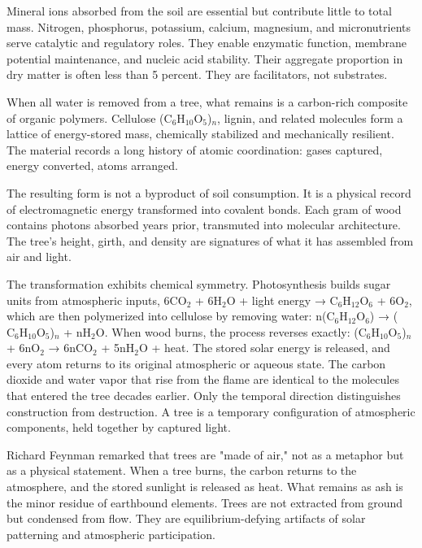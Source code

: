 Mineral ions absorbed from the soil are essential but contribute little to total mass. Nitrogen, phosphorus, potassium, calcium, magnesium, and micronutrients serve catalytic and regulatory roles. They enable enzymatic function, membrane potential maintenance, and nucleic acid stability. Their aggregate proportion in dry matter is often less than 5 percent. They are facilitators, not substrates.

When all water is removed from a tree, what remains is a carbon-rich composite of organic polymers. Cellulose (C\(_6\)H\(_{10}\)O\(_5\))\(_n\), lignin, and related molecules form a lattice of energy-stored mass, chemically stabilized and mechanically resilient. The material records a long history of atomic coordination: gases captured, energy converted, atoms arranged.

The resulting form is not a byproduct of soil consumption. It is a physical record of electromagnetic energy transformed into covalent bonds. Each gram of wood contains photons absorbed years prior, transmuted into molecular architecture. The tree's height, girth, and density are signatures of what it has assembled from air and light.

The transformation exhibits chemical symmetry. Photosynthesis builds sugar units from atmospheric inputs, 6\(\mathrm{CO}_2\) + 6\(\mathrm{H}_2\mathrm{O}\) + light energy → \(\mathrm{C}_6\mathrm{H}_{12}\mathrm{O}_6\) + 6\(\mathrm{O}_2\), which are then polymerized into cellulose by removing water: n(\(\mathrm{C}_6\mathrm{H}_{12}\mathrm{O}_6\)) → (\(\mathrm{C}_6\mathrm{H}_{10}\mathrm{O}_5\))\(_n\) + n\(\mathrm{H}_2\mathrm{O}\). When wood burns, the process reverses exactly: (\(\mathrm{C}_6\mathrm{H}_{10}\mathrm{O}_5\))\(_n\) + 6n\(\mathrm{O}_2\) → 6n\(\mathrm{CO}_2\) + 5n\(\mathrm{H}_2\mathrm{O}\) + heat. The stored solar energy is released, and every atom returns to its original atmospheric or aqueous state. The carbon dioxide and water vapor that rise from the flame are identical to the molecules that entered the tree decades earlier. Only the temporal direction distinguishes construction from destruction. A tree is a temporary configuration of atmospheric components, held together by captured light.

Richard Feynman remarked that trees are "made of air," not as a metaphor but as a physical statement. When a tree burns, the carbon returns to the atmosphere, and the stored sunlight is released as heat. What remains as ash is the minor residue of earthbound elements. Trees are not extracted from ground but condensed from flow. They are equilibrium-defying artifacts of solar patterning and atmospheric participation.

